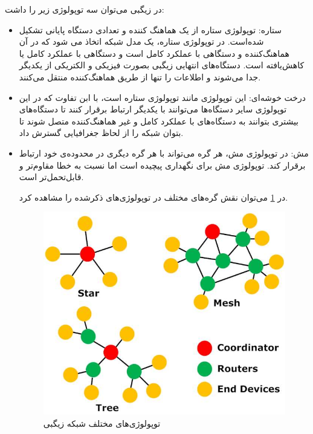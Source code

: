 در زیگبی می‌توان سه توپولوژی زیر را داشت:

\begin{itemize}
\item ستاره: توپولوژی ستاره از یک هماهنگ کننده و تعدادی دستگاه پایانی تشکیل شده‌است. در توپولوژی ستاره، یک مدل شبکه  اتخاذ می شود که در آن  هماهنگ‌کننده و دستگاهی با عملکرد کامل است و  دستگاهی با عملکرد کامل یا کاهش‌یافته است. دستگاه‌های انتهایی  زیگبی بصورت فیزیکی و الکتریکی از یکدیگر جدا می‌شوند و اطلاعات را تنها از طریق هماهنگ‌کننده منتقل می‌کنند\cite{ramya2011study}.
\item درخت خوشه‌ای: این توپولوژی مانند توپولوژی ستاره است، با ابن تفاوت که در این توپولوژی سایر دستگاه‌ها می‌توانند با یکدیگر ارتباط برقرار کنند تا دستگاه‌های بیشتری بتوانند به دستگاه‌های با عملکرد کامل و غیر هماهنگ‌کننده متصل شوند تا بتوان شبکه را از لحاظ جغرافیایی گسترش داد\cite{ramya2011study}.
\item مش: در توپولوژی مش، هر گره می‌تواند با هر گره دیگری در محدوده‌ی خود ارتباط برقرار کند. توپولوژی مش برای نگهداری پیچیده است اما نسبت به خطا مقاوم‌تر و قابل‌تحمل‌تر است\cite{ramya2011study}.

در \cref{fig:zigbee_topology} \cite{salih2012design} می‌توان نقش گره‌های مختلف در توپولوژی‌های ذکرشده را مشاهده کرد.

\begin{figure}[!h]
\centering\includegraphics[scale=.4]{zigbee_topology.png}
\caption{توپولوژی‌های مختلف شبکه زیگبی \cite{salih2012design}}\label{fig:zigbee_topology}
\end{figure}
\end{itemize}

